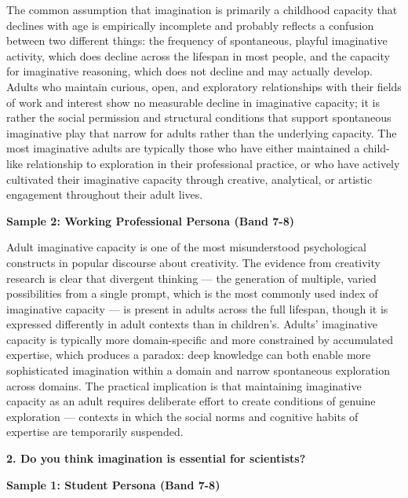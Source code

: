 The common assumption that imagination is primarily a childhood capacity that declines with age is empirically incomplete and probably reflects a confusion between two different things: the frequency of spontaneous, playful imaginative activity, which does decline across the lifespan in most people, and the capacity for imaginative reasoning, which does not decline and may actually develop. Adults who maintain curious, open, and exploratory relationships with their fields of work and interest show no measurable decline in imaginative capacity; it is rather the social permission and structural conditions that support spontaneous imaginative play that narrow for adults rather than the underlying capacity. The most imaginative adults are typically those who have either maintained a child-like relationship to exploration in their professional practice, or who have actively cultivated their imaginative capacity through creative, analytical, or artistic engagement throughout their adult lives.

\textbf{Sample 2: Working Professional Persona (Band 7-8)}

Adult imaginative capacity is one of the most misunderstood psychological constructs in popular discourse about creativity. The evidence from creativity research is clear that divergent thinking — the generation of multiple, varied possibilities from a single prompt, which is the most commonly used index of imaginative capacity — is present in adults across the full lifespan, though it is expressed differently in adult contexts than in children's. Adults' imaginative capacity is typically more domain-specific and more constrained by accumulated expertise, which produces a paradox: deep knowledge can both enable more sophisticated imagination within a domain and narrow spontaneous exploration across domains. The practical implication is that maintaining imaginative capacity as an adult requires deliberate effort to create conditions of genuine exploration — contexts in which the social norms and cognitive habits of expertise are temporarily suspended.

\separator

\begin{ieltsquestion}
\textbf{2. Do you think imagination is essential for scientists?}
\end{ieltsquestion}
\textbf{Sample 1: Student Persona (Band 7-8)}

